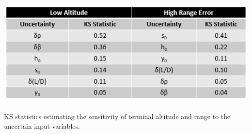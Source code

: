 \begin{table}[h!]
	\centering
	\includegraphics[width=1\textwidth]{Images/MCFTable}
	\caption{KS statistics estimating the sensitivity of terminal altitude and range to the uncertain input variables.}
	\label{Table:MCF}
\end{table}

